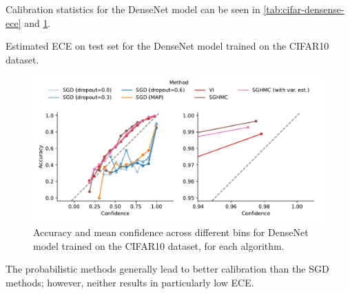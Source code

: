 Calibration statistics for the DenseNet model can be seen in \cref{tab:cifar-densense-ece} and \cref{fig:cifar-densenet-calibration}. 
\begin{table}[htbp]
    \centering
    
    \caption{Estimated ECE on test set for the DenseNet model trained on the CIFAR10 dataset.}
    \label{tab:cifar-densense-ece}
\end{table}
\begin{figure}[htbp]
    \centering
    \includegraphics[width=\linewidth]{Figures/cifar10-densenet-calibration.pdf}
    \caption{Accuracy and mean confidence across different bins for DenseNet model trained on the CIFAR10 dataset, for each algorithm.}
    \label{fig:cifar-densenet-calibration}
\end{figure}
The probabilistic methods generally lead to better calibration than the SGD methods; however, neither results in particularly low ECE.  


